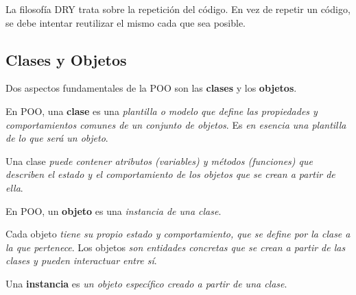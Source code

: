 \documentclass[12pt]{article}
\theoremstyle{largebreak}
\begin{document}
    \begin{obs}
        La filosofía DRY trata sobre la repetición del código. En vez de repetir un código, se debe intentar reutilizar el mismo cada que sea posible.
    \end{obs}

    \subsection{Clases y Objetos}

    Dos aspectos fundamentales de la POO son las \textbf{clases} y los \textbf{objetos}.

    \begin{mydef}
        En POO, una \textbf{clase} es una \textit{plantilla o modelo que define las propiedades y comportamientos comunes de un conjunto de objetos}. Es \textit{en esencia una plantilla de lo que será un objeto}.
    \end{mydef}

    Una clase \textit{puede contener atributos (variables) y métodos (funciones) que describen el estado y el comportamiento de los objetos que se crean a partir de ella}.

    \begin{mydef}
        En POO, un \textbf{objeto} es una \textit{instancia de una clase}.
    \end{mydef}

    Cada objeto \textit{tiene su propio estado y comportamiento, que se define por la clase a la que pertenece}. Los objetos \textit{son entidades concretas que se crean a partir de las clases y pueden interactuar entre sí}.

    \begin{mydef}
        Una \textbf{instancia} es \textit{un objeto específico creado a partir de una clase}.
    \end{mydef}
\end{document}
